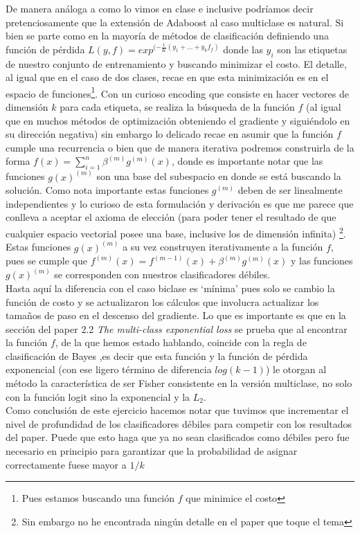 \documentclass[paper=letter, fontsize=11pt]{scrartcl}
\numberwithin{equation}{section} %
\numberwithin{figure}{section} %
\numberwithin{table}{section} %
\begin{document}
De manera análoga a como lo vimos en clase e inclusive podríamos decir pretenciosamente que la extensión de Adaboost al caso multiclase es natural. Si bien se parte como en la mayoría de métodos de clasificación definiendo una función de pérdida $L(y,f) = exp^{(-\frac{1}{K} (y_1 + … +y_kf_f)}$  donde las $y_i$ son las etiquetas de nuestro conjunto de entrenamiento y buscando minimizar el costo. El detalle, al igual que en el caso de dos clases, recae en que esta minimización es en el espacio de funciones\footnote{Pues estamos buscando una función $f$ que minimice el costo}. Con un curioso encoding que consiste en hacer vectores de dimensión $k$ para cada etiqueta, se realiza la búsqueda de la función $f$ (al igual que en muchos métodos de optimización obteniendo el gradiente y siguiéndolo en su dirección negativa) sin embargo lo delicado recae en asumir que la función $f$ cumple una recurrencia o bien que de manera iterativa podremos construirla de la forma $f (x) = \sum_{i=1}^n \beta^{(m) }g^{(m)}(x)$, donde es importante notar que las funciones $g(x)^{(m)}$ son una base del subespacio en donde se está buscando la solución. Como nota importante estas funciones $g^{(m)}$ deben de ser linealmente independientes y lo curioso de esta formulación y derivación es que me parece que conlleva a aceptar el axioma de elección (para poder tener el resultado de que cualquier espacio vectorial posee una base, inclusive los de dimensión infinita) \footnote{Sin embargo no he encontrada ningún detalle en el paper que toque el tema}. Estas funciones $g(x) ^{(m)}$ a su vez construyen iterativamente a la función $f$, pues se cumple que $f^{(m)}(x) =f^{(m-1)}(x)+\beta^{(m)}g^{(m)}(x)$ y las funciones  $g(x)^{(m)}$ se corresponden con nuestros clasificadores débiles. \\

Hasta aquí la diferencia con el caso biclase es ‘mínima’ pues solo se cambio la función de costo y se actualizaron los cálculos que involucra actualizar los tamaños de paso en el descenso del gradiente. Lo que es importante es que en la sección del paper 2.2 \textit{The multi-class exponential loss} se prueba que al encontrar la función $f$, de la que hemos estado hablando, coincide con la regla de clasificación de Bayes ,es decir que esta función y la función de pérdida exponencial (con ese ligero término de diferencia $log(k-1)$) le otorgan al método la característica de ser Fisher consistente en la versión multiclase, no solo con la función logit sino la exponencial y la $L_2$.\\
Como conclusión de este ejercicio hacemos notar que tuvimos que incrementar el nivel de profundidad de los clasificadores débiles para competir con los resultados del paper. Puede que esto haga que ya no sean clasificados como débiles pero fue necesario en principio para garantizar que la probabilidad de asignar correctamente fuese mayor a $1/k$ 
\end{document}
